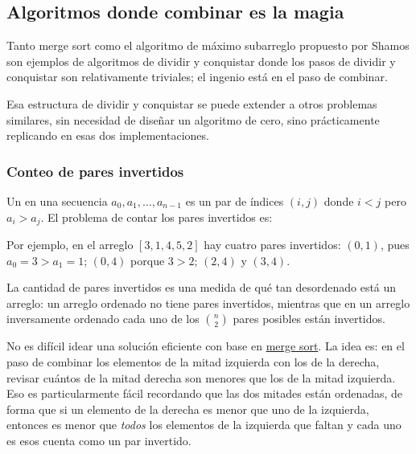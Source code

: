 \subsection{Algoritmos donde combinar es la magia}
\label{sec:conquistar}

Tanto merge sort como el algoritmo de máximo subarreglo propuesto por Shamos son ejemplos de algoritmos de dividir y conquistar donde los pasos de dividir y conquistar son relativamente triviales; el ingenio está en el paso de combinar. 

Esa estructura de dividir y conquistar se puede extender a otros problemas similares, sin necesidad de diseñar un algoritmo de cero, sino prácticamente replicando en esas dos implementaciones.

\subsubsection{Conteo de pares invertidos}

Un  en una secuencia \(a_0, a_1, \ldots, a_{n-1}\) es un par de índices \((i, j)\) donde \(i < j\) pero \(a_i > a_j\). El problema de contar los pares invertidos es:
\begin{especificacion}
\end{especificacion}
Por ejemplo, en el arreglo \([3, 1, 4, 5, 2]\) hay cuatro pares invertidos: \((0, 1)\), pues \(a_0 = 3 > a_1 = 1\); \((0, 4)\) porque \(3 > 2\); \((2, 4)\) y \((3, 4)\). 

La cantidad de pares invertidos es una medida de qué tan desordenado está un arreglo: un arreglo ordenado no tiene pares invertidos, mientras que en un arreglo inversamente ordenado cada uno de los \(\binom{n}{2}\) pares posibles están invertidos.

No es difícil idear una solución eficiente con base en \hyperref[sec:merge_sort]{merge sort}. La idea es: en el paso de combinar los elementos de la mitad izquierda con los de la derecha, revisar cuántos de la mitad derecha son menores que los de la mitad izquierda. Eso es particularmente fácil recordando que las dos mitades están ordenadas, de forma que si un elemento de la derecha es menor que uno de la izquierda, entonces es menor que \emph{todos} los elementos de la izquierda que faltan y cada uno es esos cuenta como un par invertido.

